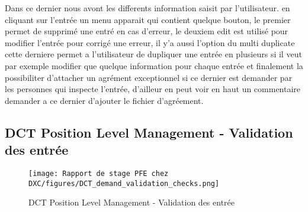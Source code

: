 Dans ce dernier nous avont les differents information saisit par l'utilisateur. en cliquant sur l'entrée un menu apparait qui contient quelque bouton, le premier permet de supprimé une entré en cas d'erreur, le deuxiem edit est utilisé pour modifier l'entrée pour corrigé une erreur, il y'a aussi l'option du multi duplicate cette derniere permet a l'utilisateur de dupliquer une entrée en plusieurs si il veut par exemple modifier que quelque information pour chaque entrée et finalement la possibiliter d'attacher un agrément exceptionnel si ce dernier est demander par les personnes qui inspecte l'entrée, d'ailleur en peut voir en haut un commentaire demander a ce dernier d'ajouter le fichier d'agréement.

\subsection{DCT Position Level Management - Validation des entrée}

\begin{figure}[H]
    \centering
    \texttt{[image: Rapport de stage PFE chez DXC/figures/DCT\_demand\_validation\_checks.png]}
    \caption{DCT Position Level Management - Validation des entrée}
\end{figure}